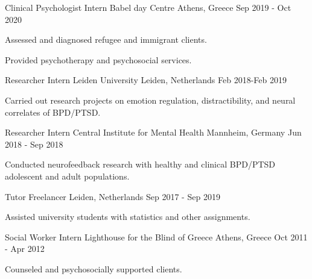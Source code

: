 

\begin{cventries}

\cventry
{Clinical Psychologist Intern} %
{Babel day Centre} %
{Athens, Greece} %
{Sep 2019 - Oct 2020} %
{
\begin{cvitems} %
\item {
Assessed and diagnosed refugee and immigrant clients.
}
\item {
Provided psychotherapy and psychosocial services.
}
\end{cvitems}
}

\cventry
{Researcher Intern}
{Leiden University}
{Leiden, Netherlands}
{Feb 2018-Feb 2019}
{
	\begin{cvitems} %
		\item {Carried out research projects on emotion regulation, distractibility, and neural correlates of BPD/PTSD.}
	\end{cvitems}
}

\cventry
{Researcher Intern} %
{Central Institute for Mental Health} %
{Mannheim, Germany} %
{Jun 2018 - Sep 2018} %
{
\begin{cvitems} %
\item {Conducted neurofeedback research with healthy and clinical BPD/PTSD adolescent and adult populations.}
\end{cvitems}
}

\cventry
{Tutor} %
{Freelancer} %
{Leiden, Netherlands} %
{Sep 2017 - Sep 2019} %
{
	\begin{cvitems}	
		\item Assisted university students with statistics and other assignments.
	\end{cvitems}
}

\cventry
{Social Worker Intern} %
{Lighthouse for the Blind of Greece} %
{Athens, Greece} %
{Oct 2011 - Apr 2012} %
{
\begin{cvitems} %
\item {Counseled and psychosocially supported clients.}
\end{cvitems}
}
\end{cventries}
